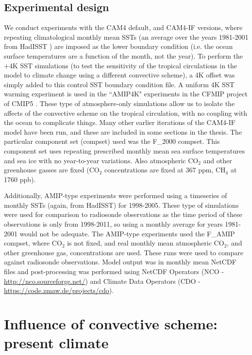 \documentclass[letterpaper,12pt,titlepage,oneside,final]{book}
\begin{document}
\section{Experimental design}

We conduct experiments with the CAM4 default, and CAM4-IF versions, where repeating climatological monthly mean SSTs (an average over the years 1981-2001 from HadISST \citep{hurrell_new_2008}) are imposed as the lower boundary condition (i.e. the ocean surface temperatures are a function of the month, not the year). To perform the +4K SST simulations (to test the sensitivity of the tropical circulations in the model to climate change using a different convective scheme), a 4K offset was simply added to this control SST boundary condition file. A uniform 4K SST warming experiment is used in the ``AMIP4K" experiments in the CFMIP project of CMIP5 \citep{bony_cfmip:_2011}. These type of atmosphere-only simulations allow us to isolate the affects of the convective scheme on the tropical circulation, with no coupling with the ocean to complicate things. Many other earlier iterations of the CAM4-IF model have been run, and these are included in some sections in the thesis. The particular component set (compset) used was the F\_2000 compset. This component set uses repeating prescribed monthly mean sea surface temperatures and sea ice with no year-to-year variations. Also atmospheric CO$_{2}$ and other greenhouse gasses are fixed (CO$_{2}$ concentrations are fixed at 367 ppm, CH$_{4}$ at 1760 ppb). 

Additionally, AMIP-type experiments \citep{taylor_overview_2011} were performed using a timeseries of monthly SSTs (again, from HadISST) for 1998-2005. These type of simulations were used for comparison to radiosonde observations as the time period of these observations is only from 1998-2011, so using a monthly average for years 1981-2001 would not be adequate. The AMIP-type experiments used the F\_AMIP compset, where CO$_{2}$ is not fixed, and real monthly mean atmospheric CO$_{2}$, and other greenhouse gas, concentrations are used. These runs were used to compare against radiosonde observations. Model output was in monthly mean NetCDF files and post-processing was performed using NetCDF Operators (NCO - \url{http://nco.sourceforge.net/}) and Climate Data Operators (CDO - \url{https://code.zmaw.de/projects/cdo}).

\chapter{Influence of convective scheme: present climate}
\end{document}
